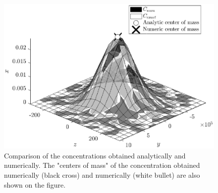 \begin{figure}[H]
	\centering
	\includegraphics[width = \textwidth]{fig/testcase/testcase_surf.eps}
	\caption{Comparison of the concentrations obtained analytically and numerically. The "centers of mass" of the concentration obtained numerically (black cross) and numerically (white bullet) are also shown on the figure.}
	\label{fig:testcase_surf}
\end{figure}
